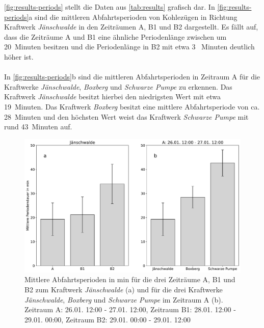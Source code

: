 \autoref{fig:results-periods} stellt die Daten aus \autoref{tab:results} grafisch dar. In \autoref{fig:results-periods}a sind die mittleren Abfahrtsperioden von Kohlezügen in Richtung Kraftwerk \emph{Jänschwalde} in den Zeiträumen A, B1 und B2 dargestellt. Es fällt auf, dass die Zeiträume A und B1 eine ähnliche Periodenlänge zwischen um 20~Minuten besitzen und die Periodenlänge in B2 mit etwa 3~ Minuten deutlich höher ist.\\
\\
In \autoref{fig:results-periods}b sind die mittleren Abfahrtsperioden in Zeitraum A für die Kraftwerke \emph{Jänschwalde}, \emph{Boxberg} und \emph{Schwarze Pumpe} zu erkennen. Das Kraftwerk \emph{Jänschwalde} besitzt hierbei den niedrigsten Wert mit etwa 19~Minuten. Das Kraftwerk \emph{Boxberg} besitzt eine mittlere Abfahrtsperiode von ca. 28~Minuten und den höchsten Wert weist das Kraftwerk \emph{Schwarze Pumpe} mit rund 43~Minuten auf.

\begin{figure}[!ht]
	\centering
	\includegraphics[width=1.0\linewidth]{images/results/periods.pdf}
	\caption{Mittlere Abfahrtsperioden in min für die drei Zeiträume A, B1 und B2 zum Kraftwerk \emph{Jänschwalde} (a) und für die drei Kraftwerke \emph{Jänschwalde}, \emph{Boxberg} und \emph{Schwarze Pumpe} im Zeitraum A (b). Zeitraum A: 26.01. 12:00 - 27.01. 12:00, Zeitraum B1: 28.01. 12:00 - 29.01. 00:00, Zeitraum B2: 29.01. 00:00 - 29.01. 12:00}
	\label{fig:results-periods}
\end{figure}


